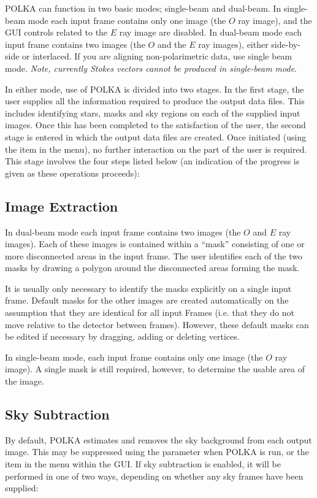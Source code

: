 POLKA can function in two basic modes; single-beam and dual-beam. In
single-beam mode each input frame contains only one image (the $O$ ray
image), and the GUI controls related to the $E$ ray image are
disabled. In dual-beam mode each input frame contains two images (the $O$
and the $E$ ray images), either side-by-side or interlaced. If you are
aligning non-polarimetric data, use single beam mode. {\em Note,
currently Stokes vectors cannot be produced in single-beam mode}.

In either mode, use of POLKA is divided into two stages. In the first
stage, the user supplies all the information required to produce the
output data files. This includes identifying stars, masks and sky regions
on each of the supplied input images. Once this has been completed to the
satisfaction of the user, the second stage is entered in which the output
data files are created. Once initiated (using the  item in the 
menu), no further interaction on the part of the user is required. This
stage involves the four steps listed below (an indication of the progress
is given as these operations proceeds):

\subsection{Image Extraction}
In dual-beam mode each input frame contains two images (the $O$ and $E$
ray images). Each of these images is contained within a ``mask''
consisting of one or more disconnected areas in the input frame. The user
identifies each of the two masks by drawing a polygon around the
disconnected areas forming the mask.

It is usually only necessary to identify the masks explicitly on a single
input frame. Default masks for the other images are created automatically 
on the assumption that they are identical for all input Frames (i.e. that
they do not move relative to the detector between frames). However, these 
default masks can be edited if necessary by dragging, adding or deleting 
vertices.

In single-beam mode, each input frame contains only one image (the $O$
ray image). A single mask is still required, however, to determine the
usable area of the image.

\subsection {Sky Subtraction}
By default, POLKA estimates and removes the sky background from each
output image. This may be suppressed using the
 parameter when POLKA is run, or the
 item in the  menu within the GUI. If sky subtraction is
enabled, it will be performed in one of two ways, depending on whether
any sky frames have been supplied:


